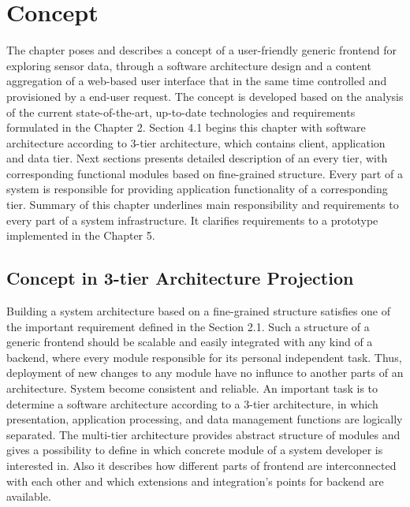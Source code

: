 \chapter{Concept}
     The chapter poses and describes a concept of a user-friendly generic frontend for exploring sensor data, through a software architecture design and a content aggregation of a web-based user interface that in the same time controlled and provisioned by a end-user request. The concept is developed based on the analysis of the current state-of-the-art, up-to-date technologies and requirements formulated in the Chapter 2. 
     \newline
     Section 4.1 begins this chapter with software architecture according to 3-tier architecture, which contains client, application and data tier. Next sections presents detailed description of an every tier, with corresponding functional modules based on fine-grained structure. Every part of a system is responsible for providing application functionality of a corresponding tier. Summary of this chapter underlines main responsibility and requirements to every part of a system infrastructure. It clarifies requirements to a prototype implemented in the Chapter 5.


\section{Concept in 3-tier Architecture Projection}

  Building a system architecture based on a fine-grained structure satisfies one of the important requirement defined in the Section 2.1. Such a structure of a generic frontend should be scalable and easily integrated with any kind of a backend, where every module responsible for its personal independent task. Thus, deployment of new changes to any module have no influnce to another parts of an architecture. System become consistent and reliable. An important task is to determine a software architecture according to a 3-tier architecture, in which presentation, application processing, and data management functions are logically separated. The multi-tier architecture provides abstract structure of modules and gives a possibility to define in which concrete module of a system developer is interested in. Also it describes how different parts of frontend are interconnected with each other and which extensions and integration's points for backend are available.

